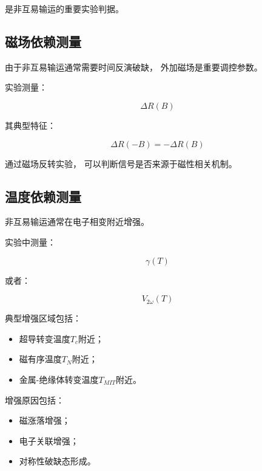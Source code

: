 \documentclass[10.5pt]{article}
\begin{document}
是非互易输运的重要实验判据。



\subsection{磁场依赖测量}


由于非互易输运通常需要时间反演破缺，
外加磁场是重要调控参数。


实验测量：

\begin{equation}
\Delta R(B)
\end{equation}


其典型特征：

\begin{equation}
\Delta R(-B)
=
-\Delta R(B)
\end{equation}


通过磁场反转实验，
可以判断信号是否来源于磁性相关机制。



\subsection{温度依赖测量}


非互易输运通常在电子相变附近增强。


实验中测量：

\begin{equation}
\gamma(T)
\end{equation}


或者：

\begin{equation}
V_{2\omega}(T)
\end{equation}


典型增强区域包括：

\begin{itemize}
\item 超导转变温度$T_c$附近；
\item 磁有序温度$T_N$附近；
\item 金属-绝缘体转变温度$T_{MIT}$附近。
\end{itemize}


增强原因包括：

\begin{itemize}
\item 磁涨落增强；
\item 电子关联增强；
\item 对称性破缺态形成。
\end{itemize}
\end{document}
